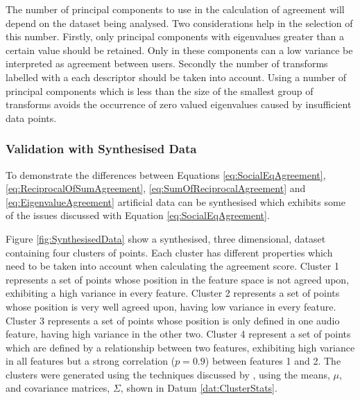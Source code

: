 			The number of principal components to use in the calculation of agreement will depend on the
			dataset being analysed. Two considerations help in the selection of this number. Firstly, only
			principal components with eigenvalues greater than a certain value should be retained. Only in
			these components can a low variance be interpreted as agreement between users. Secondly the number
			of transforms labelled with a each descriptor should be taken into account. Using a number of
			principal components which is less than the size of the smallest group of transforms avoids the
			occurrence of zero valued eigenvalues caused by insufficient data points.

		\subsubsection*{Validation with Synthesised Data}
			To demonstrate the differences between Equations \ref{eq:SocialEqAgreement},
			\ref{eq:ReciprocalOfSumAgreement}, \ref{eq:SumOfReciprocalAgreement} and
			\ref{eq:EigenvalueAgreement} artificial data can be synthesised which exhibits some of the issues
			discussed with Equation \ref{eq:SocialEqAgreement}.
			
			Figure \ref{fig:SynthesisedData} show a synthesised, three dimensional, dataset containing four
			clusters of points. Each cluster has different properties which need to be taken into account when
			calculating the agreement score. Cluster 1 represents a set of points whose position in the feature
			space is not agreed upon, exhibiting a high variance in every feature. Cluster 2 represents a set
			of points whose position is very well agreed upon, having low variance in every feature. Cluster 3
			represents a set of points whose position is only defined in one audio feature, having high
			variance in the other two. Cluster 4 represent a set of points which are defined by a relationship
			between two features, exhibiting high variance in all features but a strong correlation ($p = 0.9$)
			between features 1 and 2. The clusters were generated using the techniques discussed by
			\citet{ripley1987stochastic}, using the means, $\mu$, and covariance matrices, $\Sigma$, shown in
			Datum \ref{dat:ClusterStats}.

